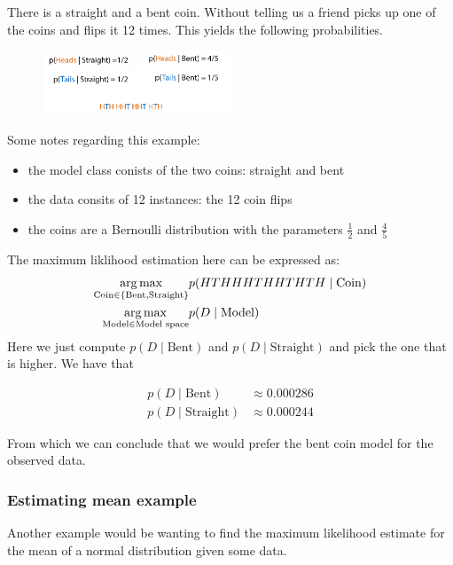 \documentclass[12pt]{article}
\begin{document}
There is a straight and a bent coin. Without telling us a friend picks up one of the coins and flips it 12 times. This yields the following probabilities.

\begin{figure}[!h]
    \centering
    \includegraphics[width=0.5\textwidth]{assets/coinflip.png}
\end{figure}

Some notes regarding this example: 
\begin{itemize}[leftmargin=*, noitemsep]
    \item the model class conists of the two coins: straight and bent
    \item the data consits of 12 instances: the 12 coin flips
    \item the coins are a Bernoulli distribution with the parameters $\frac{1}{2}$ and $\frac{4}{5}$
\end{itemize}

The maximum liklihood estimation here can be expressed as: 
\begin{align*}
    \operatorname*{arg\, max}_{\text{Coin}\in\{\text{Bent}, \text{Straight}\}} & p(HTHHHTHHTHTH\mid \text{Coin}) \\
    \operatorname*{arg\, max}_{\text{Model}\in \text{Model space}} & p(D\mid \text{Model})
\end{align*}
Here we just compute $p(D\mid \text{Bent})$ and $p(D\mid \text{Straight})$ and pick the one that is higher. We have that 

\begin{align*}
    p(D\mid \text{Bent}) & \approx 0.000286 \\ 
    p(D\mid \text{Straight}) & \approx 0.000244
\end{align*}

From which we can conclude that we would prefer the bent coin model for the observed data.

\subsubsection*{Estimating mean example}

Another example would be wanting to find the maximum likelihood estimate for the mean of a normal distribution given some data.
\end{document}
